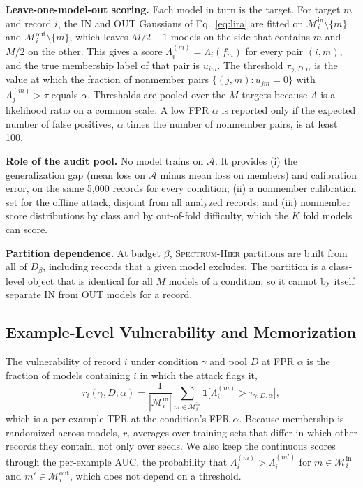 \documentclass{article} %
\newcommand{\cn}[1]{\textsc{#1}}
\newcommand{\audit}{\mathcal{A}}
\newcommand{\inset}{\mathcal{M}^{\mathrm{in}}}
\newcommand{\outset}{\mathcal{M}^{\mathrm{out}}}
\begin{document}
\textbf{Leave-one-model-out scoring.} Each model in turn is the target. For target $m$ and record $i$, the IN and OUT Gaussians of Eq.~\ref{eq:lira} are fitted on $\inset_i\setminus\{m\}$ and $\outset_i\setminus\{m\}$, which leaves $M/2-1$ models on the side that contains $m$ and $M/2$ on the other. This gives a score $\Lambda_i^{(m)}=\Lambda_i(f_m)$ for every pair $(i,m)$, and the true membership label of that pair is $u_{im}$. The threshold $\tau_{\gamma,D,\alpha}$ is the value at which the fraction of nonmember pairs $\{(j,m):u_{jm}=0\}$ with $\Lambda_j^{(m)}>\tau$ equals $\alpha$. Thresholds are pooled over the $M$ targets because $\Lambda$ is a likelihood ratio on a common scale. A low FPR $\alpha$ is reported only if the expected number of false positives, $\alpha$ times the number of nonmember pairs, is at least 100.

\textbf{Role of the audit pool.} No model trains on $\audit$. It provides (i) the generalization gap (mean loss on $\audit$ minus mean loss on members) and calibration error, on the same 5,000 records for every condition; (ii) a nonmember calibration set for the offline attack, disjoint from all analyzed records; and (iii) nonmember score distributions by class and by out-of-fold difficulty, which the $K$ fold models can score.

\textbf{Partition dependence.} At budget $\beta$, \cn{Spectrum-Hier} partitions are built from all of $D_\beta$, including records that a given model excludes. The partition is a class-level object that is identical for all $M$ models of a condition, so it cannot by itself separate IN from OUT models for a record.

\subsection{Example-Level Vulnerability and Memorization}
\label{sec:vulnerability}

The vulnerability of record $i$ under condition $\gamma$ and pool $D$ at FPR $\alpha$ is the fraction of models containing $i$ in which the attack flags it,
\begin{equation}
r_i(\gamma,D;\alpha)=\frac{1}{|\inset_i|}\sum_{m\in\inset_i}\mathbf{1}\big[\Lambda_i^{(m)}>\tau_{\gamma,D,\alpha}\big],
\label{eq:vuln}
\end{equation}
which is a per-example TPR at the condition's FPR $\alpha$. Because membership is randomized across models, $r_i$ averages over training sets that differ in which other records they contain, not only over seeds. We also keep the continuous scores through the per-example AUC, the probability that $\Lambda_i^{(m)}>\Lambda_i^{(m')}$ for $m\in\inset_i$ and $m'\in\outset_i$, which does not depend on a threshold.
\end{document}
